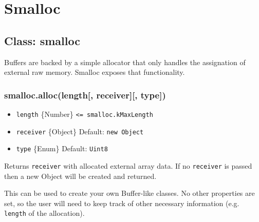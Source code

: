\section{Smalloc}\label{smalloc}

\begin{Shaded}
\begin{Highlighting}[]
 
\end{Highlighting}
\end{Shaded}

\subsection{Class: smalloc}\label{class-smalloc}

Buffers are backed by a simple allocator that only handles the
assignation of external raw memory. Smalloc exposes that functionality.

\subsubsection{smalloc.alloc(length{[}, receiver{]}{[},
type{]})}\label{smalloc.alloclength-receiver-type}

\begin{itemize}
\itemsep1pt\parskip0pt
\item
  \texttt{length} \{Number\} \texttt{\textless{}=\ smalloc.kMaxLength}
\item
  \texttt{receiver} \{Object\} Default: \texttt{new\ Object}
\item
  \texttt{type} \{Enum\} Default: \texttt{Uint8}
\end{itemize}

Returns \texttt{receiver} with allocated external array data. If no
\texttt{receiver} is passed then a new Object will be created and
returned.

This can be used to create your own Buffer-like classes. No other
properties are set, so the user will need to keep track of other
necessary information (e.g. \texttt{length} of the allocation).

\begin{Shaded}
\begin{Highlighting}[]
 
   
  \NormalTok{(}\NormalTok{, }\NormalTok{);}
\NormalTok{\}}

 \NormalTok{= \{ } \NormalTok{\};}
\end{Highlighting}
\end{Shaded}

